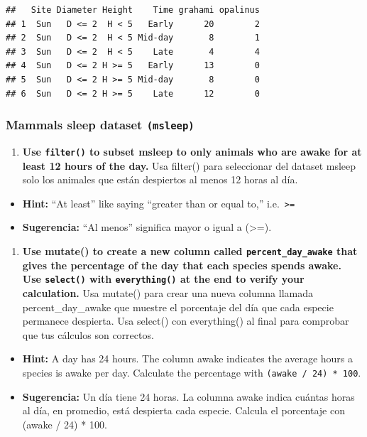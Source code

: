 \documentclass[
]{article}
\providecommand{\tightlist}{%
  \setlength{\itemsep}{0pt}\setlength{\parskip}{0pt}}
\begin{document}
\begin{verbatim}
##   Site Diameter Height    Time grahami opalinus
## 1  Sun   D <= 2  H < 5   Early      20        2
## 2  Sun   D <= 2  H < 5 Mid-day       8        1
## 3  Sun   D <= 2  H < 5    Late       4        4
## 4  Sun   D <= 2 H >= 5   Early      13        0
## 5  Sun   D <= 2 H >= 5 Mid-day       8        0
## 6  Sun   D <= 2 H >= 5    Late      12        0
\end{verbatim}

\subsubsection{\texorpdfstring{\textbf{Mammals sleep dataset
\texttt{(msleep)}}}{Mammals sleep dataset (msleep)}}\label{mammals-sleep-dataset-msleep}

\begin{enumerate}
\def\labelenumi{\arabic{enumi}.}
\tightlist
\item
  \textbf{Use \texttt{filter()} to subset msleep to only animals who are
  awake for at least 12 hours of the day.} Usa filter() para seleccionar
  del dataset msleep solo los animales que están despiertos al menos 12
  horas al día.
\end{enumerate}

\begin{itemize}
\tightlist
\item
  \textbf{Hint:} ``At least'' like saying ``greater than or equal to,''
  i.e.~\texttt{\textgreater{}=}
\item
  \textbf{Sugerencia:} ``Al menos'' significa mayor o igual a
  (\textgreater=).
\end{itemize}

\begin{enumerate}
\def\labelenumi{\arabic{enumi}.}
\setcounter{enumi}{1}
\tightlist
\item
  \textbf{Use mutate() to create a new column called
  \texttt{percent\_day\_awake} that gives the percentage of the day that
  each species spends awake. Use \texttt{select()} with
  \texttt{everything()} at the end to verify your calculation.} Usa
  mutate() para crear una nueva columna llamada percent\_day\_awake que
  muestre el porcentaje del día que cada especie permanece despierta.
  Usa select() con everything() al final para comprobar que tus cálculos
  son correctos.
\end{enumerate}

\begin{itemize}
\tightlist
\item
  \textbf{Hint:} A day has 24 hours. The column awake indicates the
  average hours a species is awake per day. Calculate the percentage
  with \texttt{(awake\ /\ 24)\ *\ 100}.
\item
  \textbf{Sugerencia:} Un día tiene 24 horas. La columna awake indica
  cuántas horas al día, en promedio, está despierta cada especie.
  Calcula el porcentaje con (awake / 24) * 100.
\end{itemize}
\end{document}
